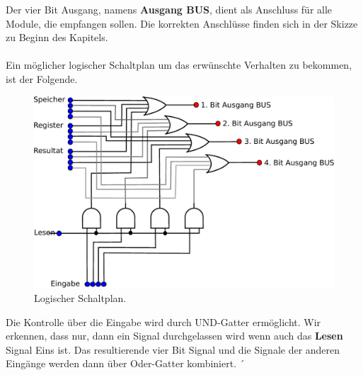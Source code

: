 \documentclass[11pt,a4paper,leqno]{report}
\numberwithin{equation}{chapter}
\begin{document}
Der vier Bit Ausgang, namens \textbf{Ausgang BUS}, dient als Anschluss f\"ur alle Module, die empfangen sollen. Die korrekten Anschl\"usse finden sich in der Skizze zu Beginn des Kapitels.\\
\\
Ein m\"oglicher logischer Schaltplan um das erw\"unschte Verhalten zu bekommen, ist der Folgende.
\begin{figure}[H]
	\begin{center}
		\includegraphics[scale=0.8]{BUS.pdf}
		\caption{Logischer Schaltplan.}
	\end{center}
\end{figure}
\noindent
Die Kontrolle \"uber die Eingabe wird durch UND-Gatter erm\"oglicht. Wir erkennen, dass nur, dann ein Signal durchgelassen wird wenn auch das \textbf{Lesen} Signal Eins ist. Das resultierende vier Bit Signal und die Signale der anderen Eing\"ange werden dann \"uber Oder-Gatter kombiniert. 
\newpage´
\end{document}
